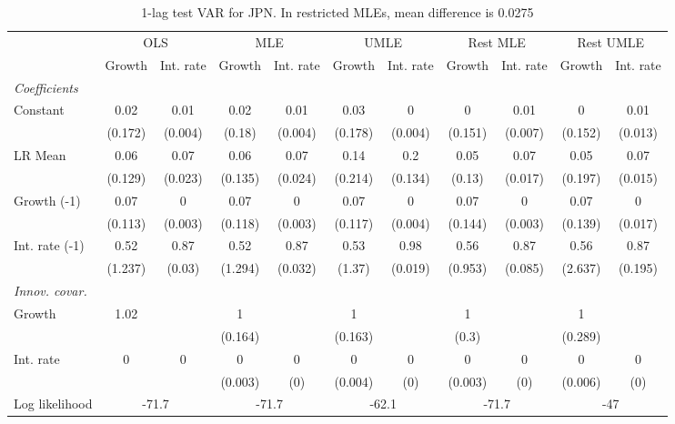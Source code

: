 \begin{table}[htbp] 
	\centering
	\begin{tabular}{@{\extracolsep{4pt}}lcccccccccc@{}}		\hline\hline
		 		 & \multicolumn{2}{c}{OLS} &\multicolumn{2}{c}{MLE} &\multicolumn{2}{c}{UMLE} &\multicolumn{2}{c}{Rest MLE} &\multicolumn{2}{c}{Rest UMLE} \\ 
 		 & Growth 	 & Int. rate 	 & Growth 	 & Int. rate 	 & Growth 	 & Int. rate 	 & Growth 	 & Int. rate 	 & Growth 	 & Int. rate\\\cline{2-3}\cline{4-5}\cline{6-7}\cline{8-9}\cline{10-11}
\rule{0pt}{4ex} 
 \emph{Coefficients} 	  		 & 		 & 		 & 		 & 		 & 		 & 		 & 		 & 		 & 		 &\\ 
\quad Constant 	 & 0.02 	 & 0.01 	 & 0.02 	 & 0.01 	 & 0.03 	 & 0 	 & 0 	 & 0.01 	 & 0 	 & 0.01	 \\ 
 		 & (0.172) 	 & (0.004) 	 & (0.18) 	 & (0.004) 	 & (0.178) 	 & (0.004) 	 & (0.151) 	 & (0.007) 	 & (0.152) 	 & (0.013) 	 \\ 
\quad LR Mean 	 & 0.06 	 & 0.07 	 & 0.06 	 & 0.07 	 & 0.14 	 & 0.2 	 & 0.05 	 & 0.07 	 & 0.05 	 & 0.07	 \\ 
 		 & (0.129) 	 & (0.023) 	 & (0.135) 	 & (0.024) 	 & (0.214) 	 & (0.134) 	 & (0.13) 	 & (0.017) 	 & (0.197) 	 & (0.015) 	 \\ 
\quad Growth (-1) 	 &0.07 	 & 0 	 & 0.07 	 & 0 	 & 0.07 	 & 0 	 & 0.07 	 & 0 	 & 0.07 	 & 0	 \\ 
 		 & (0.113) 	 & (0.003) 	 & (0.118) 	 & (0.003) 	 & (0.117) 	 & (0.004) 	 & (0.144) 	 & (0.003) 	 & (0.139) 	 & (0.017) 	 \\ 
\quad Int. rate (-1) 	 &0.52 	 & 0.87 	 & 0.52 	 & 0.87 	 & 0.53 	 & 0.98 	 & 0.56 	 & 0.87 	 & 0.56 	 & 0.87	 \\ 
 		 & (1.237) 	 & (0.03) 	 & (1.294) 	 & (0.032) 	 & (1.37) 	 & (0.019) 	 & (0.953) 	 & (0.085) 	 & (2.637) 	 & (0.195) 	 \\ 
\rule{0pt}{4ex} \emph{Innov. covar.}  	 & 	 & 	 & 	 & 	 & 	 & 	 & 	 & 	 & 	 &\\ 
\quad Growth 	 &1.02 	 &  	 & 1 	 &  	 & 1 	 &  	 & 1 	 &  	 & 1 	 & 	 \\ 
 		 &  	 &  	 & (0.164) 	 &  	 & (0.163) 	 &  	 & (0.3) 	 &  	 & (0.289) 	 &  	 \\ 
\quad Int. rate 	 &0 	 & 0 	 & 0 	 & 0 	 & 0 	 & 0 	 & 0 	 & 0 	 & 0 	 & 0	 \\ 
 		 &  	 &  	 & (0.003) 	 & (0) 	 & (0.004) 	 & (0) 	 & (0.003) 	 & (0) 	 & (0.006) 	 & (0) 	 \\ 
 \hline \rule{0pt}{4ex} 
  Log likelihood 	 &\multicolumn{2}{c}{-71.7} 	 & \multicolumn{2}{c}{-71.7} 	 & \multicolumn{2}{c}{-62.1} 	 & \multicolumn{2}{c}{-71.7} 	 & \multicolumn{2}{c}{-47}\\ 

 \hline 	\end{tabular}		\caption{1-lag test VAR for JPN. In restricted MLEs, mean difference is 0.0275}
		\label{tab:JPN1lag}

\end{table}
